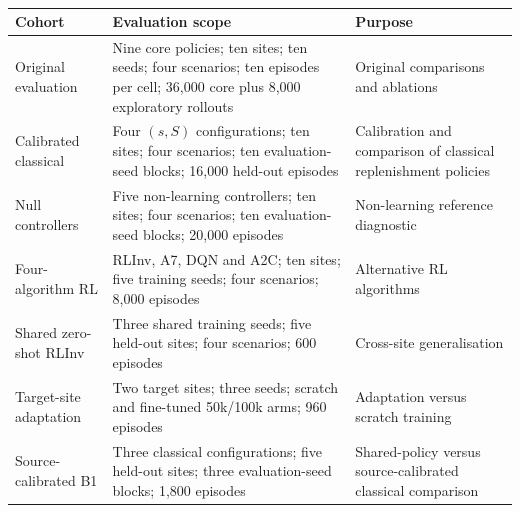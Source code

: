 \begin{table}[htbp]
\centering
\footnotesize
\setlength{\tabcolsep}{4pt}
\renewcommand{\arraystretch}{1.15}
\caption{}
\label{tab:supplementary_protocols}

\begin{tabularx}{\textwidth}{
p{2.6cm}
p{5.0cm}
X
}
\toprule
\textbf{Cohort} &
\textbf{Evaluation scope} &
\textbf{Purpose} \\
\midrule

Original evaluation &
Nine core policies; ten sites; ten seeds;
four scenarios; ten episodes per cell;
36,000 core plus 8,000 exploratory rollouts &
Original comparisons and ablations \\

Calibrated classical &
Four $(s,S)$ configurations;
ten sites; four scenarios;
ten evaluation-seed blocks;
16,000 held-out episodes &
Calibration and comparison of classical
replenishment policies \\

Null controllers &
Five non-learning controllers;
ten sites; four scenarios;
ten evaluation-seed blocks;
20,000 episodes &
Non-learning reference diagnostic \\

Four-algorithm RL &
RLInv, A7, DQN and A2C;
ten sites; five training seeds;
four scenarios; 8,000 episodes &
Alternative RL algorithms \\

Shared zero-shot RLInv &
Three shared training seeds;
five held-out sites;
four scenarios; 600 episodes &
Cross-site generalisation \\

Target-site adaptation &
Two target sites; three seeds;
scratch and fine-tuned 50k/100k arms;
960 episodes &
Adaptation versus scratch training \\

Source-calibrated B1 &
Three classical configurations;
five held-out sites;
three evaluation-seed blocks;
1,800 episodes &
Shared-policy versus source-calibrated
classical comparison \\

\bottomrule
\end{tabularx}
\end{table}


\subsection{}

